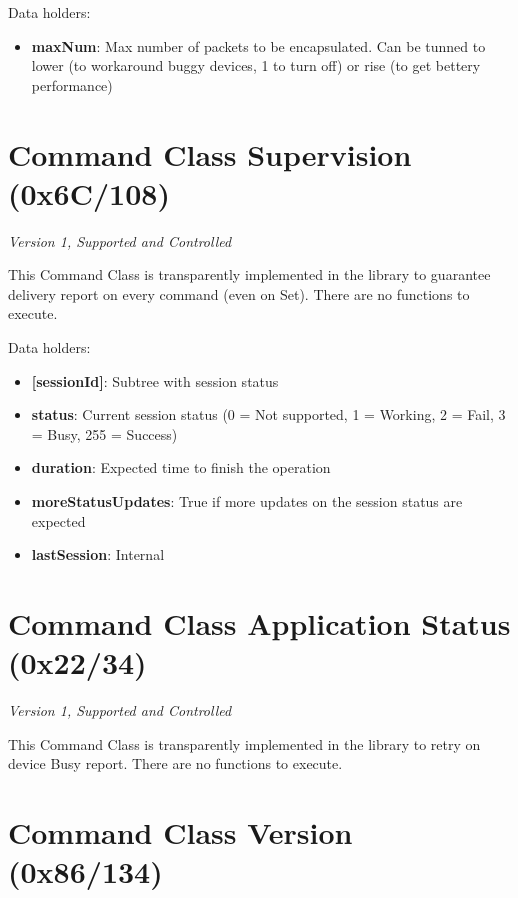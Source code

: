 \noindent
Data holders:

\begin{itemize}
\item \textbf{maxNum}: Max number of packets to be encapsulated. Can be tunned to lower (to workaround buggy devices, 1 to turn off) or rise (to get bettery performance)
\end{itemize}


\section{Command Class Supervision (0x6C/108)}

\textit{Version 1, Supported and Controlled}
\newline

This Command Class is transparently implemented in the library to guarantee delivery report on every command (even on Set). There are no functions to execute.
\newline

\noindent
Data holders:

\begin{itemize}
\item \textbf{[sessionId]}: Subtree with session status
\item \qquad\textbf{status}: Current session status (0 = Not supported, 1 = Working, 2 = Fail, 3 = Busy, 255 = Success)
\item \qquad\textbf{duration}: Expected time to finish the operation
\item \qquad\textbf{moreStatusUpdates}: True if more updates on the session status are expected
\item \textbf{lastSession}: Internal
\end{itemize}


\section{Command Class Application Status (0x22/34)}

\textit{Version 1, Supported and Controlled}
\newline

This Command Class is transparently implemented in the library to retry on device Busy report. There are no functions to execute.

\section{Command Class Version (0x86/134)}


